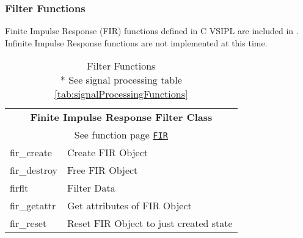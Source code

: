 \subsubsection*{Filter Functions} 
Finite Impulse Response (FIR) functions defined in C VSIPL are included in \pyjv. Infinite Impulse Response functions are not implemented at this time.
\begin{table}[H]
\caption{Filter Functions \\* See signal processing table \ref{tab:signalProcessingFunctions}}
\label{tab:filterFunctions}
\begin{center}
\begin{tabular}{|l|l|}
\multicolumn{2}{c}{\rmfamily \bfseries Finite Impulse Response Filter Class}\\
\multicolumn{2}{c}{See function page \hyperlink{firFunc}{\texttt{FIR}}} \\ \hline
fir\_create & Create FIR Object\\
fir\_destroy & Free FIR Object\\
firflt & Filter Data\\
fir\_getattr & Get attributes of FIR Object\\
fir\_reset & Reset FIR Object to just created state\\ \hline
\end{tabular}
\end{center}
\label{default}
\end{table}%